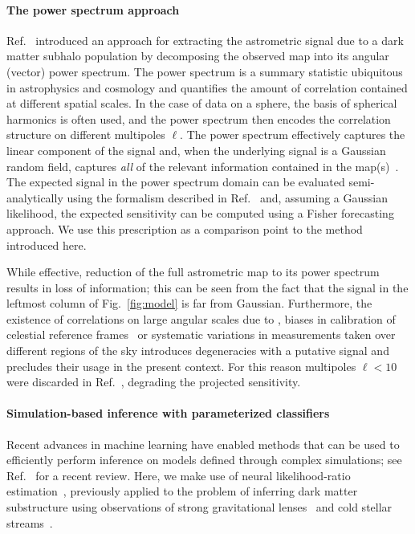 \documentclass[]{article}
\begin{document}
\paragraph{The power spectrum approach} Ref.~\cite{Mishra-Sharma:2020ynk} introduced an approach for extracting the astrometric signal due to a dark matter subhalo population by decomposing the observed map into its angular (vector) power spectrum. The power spectrum is a summary statistic ubiquitous in astrophysics and cosmology and quantifies the amount of correlation contained at different spatial scales. In the case of data on a sphere, the basis of spherical harmonics is often used, and the power spectrum then encodes the correlation structure on different multipoles $\ell$. The power spectrum effectively captures the linear component of the signal and, when the underlying signal is a Gaussian random field, captures \emph{all} of the relevant information contained in the map(s)~\citep{Tegmark:1996qt}.
The expected signal in the power spectrum domain can be evaluated semi-analytically using the formalism described in Ref.~\cite{Mishra-Sharma:2020ynk} and, assuming a Gaussian likelihood, the expected sensitivity can be computed using a Fisher forecasting approach. We use this prescription as a comparison point to the method introduced here.

While effective, reduction of the full astrometric map to its power spectrum results in loss of information; this can be seen from the fact that the signal in the leftmost column of Fig.~\ref{fig:model} is far from Gaussian. Furthermore, the existence of correlations on large angular scales due to \eg, biases in calibration of celestial reference frames~\citep{2018A&A...616A..14G} or systematic variations in measurements taken over different regions of the sky introduces degeneracies with a putative signal and precludes their usage in the present context. For this reason multipoles $\ell < 10$ were discarded in Ref.~\cite{Mishra-Sharma:2020ynk}, degrading the projected sensitivity.

\paragraph{Simulation-based inference with parameterized classifiers} Recent advances in machine learning have enabled methods that can be used to efficiently perform inference on models defined through complex simulations; see Ref.~\cite{Cranmer:2019eaq} for a recent review. Here, we make use of neural likelihood-ratio estimation~\citep{Cranmer:2015bka,Baldi:2016fzo,Brehmer:2018eca,Brehmer:2018hga,Brehmer:2018kdj,Hermans:2019ioj}, previously applied to the problem of inferring dark matter substructure using observations of strong gravitational lenses~\citep{Brehmer:2019jyt} and cold stellar streams~\citep{Hermans:2020skz}. 
\end{document}
